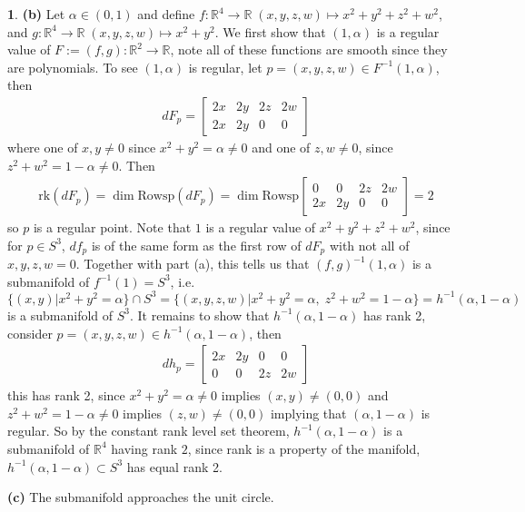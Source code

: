\documentclass[10.5pt]{article}
\theoremstyle{definition}
\newtheorem{pb}{}
\newcommand{\set}[1]{\{#1\}}
\begin{document}
\begin{pb}
        \textbf{(b)} Let \(\alpha \in (0,1)\) and define \(f: \mathbb{R}^4 \to \mathbb{R} \; (x,y,z,w) \mapsto x^2 + y^2 + z^2 + w^2\), and \(g: \mathbb{R}^4 \to \mathbb{R} \; (x,y,z,w) \mapsto x^2 + y^2\).
        We first show that \((1,\alpha)\) is a regular value of \(F := (f,g): \mathbb{R}^2 \to \mathbb{R}\), note all of these functions are smooth since they are polynomials. 
        To see \((1,\alpha)\) is regular, let \(p = (x,y,z,w) \in F^{-1}(1,\alpha)\), then
        \begin{align*}
            dF_p = \begin{bmatrix} 2x & 2y & 2z & 2w \\ 2x & 2y & 0 & 0 \end{bmatrix}
        \end{align*}
        where one of \(x,y \neq 0\) since \(x^2 + y^2 = \alpha \neq 0\) and one of \(z,w \neq 0\), since \(z^2 + w^2 = 1-\alpha \neq 0\). Then
        \begin{align*}
            \text{rk}(dF_p) = \dim\text{Rowsp}(dF_p) = \dim\text{Rowsp} \begin{bmatrix} 0 & 0 & 2z & 2w \\ 2x & 2y & 0 & 0\end{bmatrix} = 2
        \end{align*}
        so \(p\) is a regular point. Note that \(1\) is a regular value of \(x^2 + y^2 + z^2 + w^2\), since for \(p \in S^3\), \(df_p\) is of the same form as the first row of \(dF_p\)
        with not all of \(x,y,z,w = 0\).
        Together with part (a), this tells us that \((f,g)^{-1}(1,\alpha)\) is a submanifold of \(f^{-1}(1) = S^3\), i.e.
        \[\set{(x,y) \vert x^2 + y^2 = \alpha} \cap S^3 = \set{(x,y,z,w) \vert x^2 + y^2 = \alpha, \; z^2 + w^2 = 1 - \alpha} = h^{-1}(\alpha,1-\alpha)\]
        is a submanifold of \(S^3\). It remains to show that \(h^{-1}(\alpha,1-\alpha)\) has rank 2, consider \(p = (x,y,z,w) \in h^{-1}(\alpha,1-\alpha)\), then
        \begin{align*}
            dh_p = \begin{bmatrix} 2x & 2y & 0 & 0 \\ 0 & 0 & 2z & 2w \end{bmatrix}
        \end{align*}
        this has rank 2, since \(x^2 + y^2 = \alpha \neq 0\) implies \((x,y) \neq (0,0)\) and \(z^2 + w^2 = 1-\alpha \neq 0\) implies \((z,w) \neq (0,0)\) implying that \((\alpha,1-\alpha)\) is regular.
        So by the constant rank level set theorem, \(h^{-1}(\alpha,1-\alpha)\) is a submanifold of \(\mathbb{R}^4\) having rank \(2\), since rank is a property of the manifold, \(h^{-1}(\alpha,1-\alpha) \subset S^3\)
        has equal rank 2.

        \textbf{(c)} The submanifold approaches the unit circle.

    \end{pb}
\end{document}
